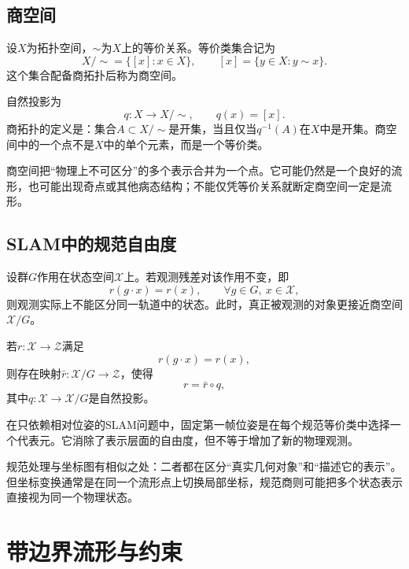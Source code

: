 \subsection{商空间}

\begin{definition}[等价关系与商空间]
设$X$为拓扑空间，$\sim$为$X$上的等价关系。等价类集合记为
\[
    X/{\sim}
    =
    \{[x]:x\in X\},
    \qquad
    [x]=\{y\in X:y\sim x\}.
\]
这个集合配备商拓扑后称为商空间。
\end{definition}

自然投影为
\[
    q:X\to X/{\sim},
    \qquad
    q(x)=[x].
\]
商拓扑的定义是：集合$A\subset X/{\sim}$是开集，当且仅当$q^{-1}(A)$在$X$中是开集。商空间中的一个点不是$X$中的单个元素，而是一个等价类。

\begin{remark}[商空间与局部坐标]
商空间把“物理上不可区分”的多个表示合并为一个点。它可能仍然是一个良好的流形，也可能出现奇点或其他病态结构；不能仅凭等价关系就断定商空间一定是流形。
\end{remark}

\subsection{SLAM中的规范自由度}

设群$G$作用在状态空间$\mathcal X$上。若观测残差对该作用不变，即
\[
    r(g\cdot x)=r(x),
    \qquad
    \forall g\in G,\ x\in\mathcal X,
\]
则观测实际上不能区分同一轨道中的状态。此时，真正被观测的对象更接近商空间$\mathcal X/G$。

\begin{theorem}[残差下降到商空间]
若$r:\mathcal X\to\mathcal Z$满足
\[
    r(g\cdot x)=r(x),
\]
则存在映射$\bar r:\mathcal X/G\to\mathcal Z$，使得
\[
    r=\bar r\circ q,
\]
其中$q:\mathcal X\to\mathcal X/G$是自然投影。
\end{theorem}

\begin{corollary}[固定首帧]
在只依赖相对位姿的SLAM问题中，固定第一帧位姿是在每个规范等价类中选择一个代表元。它消除了表示层面的自由度，但不等于增加了新的物理观测。
\end{corollary}

规范处理与坐标图有相似之处：二者都在区分“真实几何对象”和“描述它的表示”。但坐标变换通常是在同一个流形点上切换局部坐标，规范商则可能把多个状态表示直接视为同一个物理状态。


\section{带边界流形与约束}

